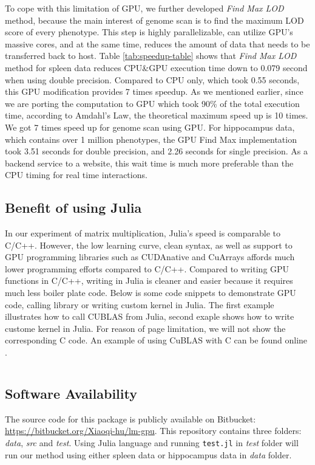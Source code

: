 \documentclass[9pt,twocolumn,twoside,lineno]{gsag3jnl}
\newcommand{\code}{\texttt}
\begin{document}
To cope with this limitation of GPU, we further developed \textit{Find Max LOD} method, because the main interest of genome scan is to find the maximum LOD score of every phenotype. 
This step is highly parallelizable, can utilize GPU's massive cores, and at the same time, reduces the amount of data that needs to be transferred back to host. 
Table \ref{tab:speedup-table} shows that \textit{Find Max LOD} method for spleen data reduces CPU\&GPU execution time down to 0.079 second when using double precision. 
Compared to CPU only, which took 0.55 seconds, this GPU modification provides 7 times speedup. 
As we mentioned earlier, since we are porting the computation to GPU which took 90\% of the total execution time, according to Amdahl's Law, the theoretical maximum speed up is 10 times. 
We got 7 times speed up for genome scan using GPU. 
For hippocampus data, which contains over 1 million phenotypes, the GPU Find Max implementation took 3.51 seconds for double precision, and 2.26 seconds for single precision. 
As a backend service to a website, this wait time is much more preferable than the CPU timing for real time interactions. 

\subsection{Benefit of using Julia}
In our experiment of matrix multiplication, Julia's speed is comparable to C/C++. 
However, the low learning curve, clean syntax, as well as support to GPU programming libraries such as CUDAnative \citep{CUDAnative.jl-2018} and CuArrays \citep{cuarray} affords much lower programming efforts compared to C/C++.
Compared to writing GPU functions in C/C++, writing in Julia is cleaner and easier because it requires much less boiler plate code.
Below is some code snippets to demonstrate GPU code, calling library or writing custom kernel in Julia. 
The first example illustrates how to call CUBLAS from Julia, second exaple shows how to write custome kernel in Julia. 
For reason of page limitation, we will not show the corresponding C code. 
An example of using CuBLAS with C can be found online \citep{cublas-example-code}. 
\inputminted{julia}{code/gpu.jl}

\subsection{Software Availability}
The source code for this package is publicly available on Bitbucket: \url{https://bitbucket.org/Xiaoqi-hu/lm-gpu}.
This repository contains three folders: \textit{data}, \textit{src} and \textit{test}. 
Using Julia language and running \code{test.jl} in \textit{test} folder will run our method using either spleen data or hippocampus data in \textit{data} folder. 
\end{document}
